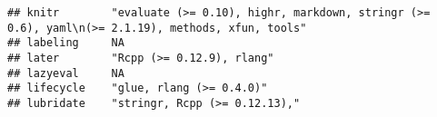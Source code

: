 \documentclass[]{book}
\begin{document}
\begin{verbatim}
## knitr        "evaluate (>= 0.10), highr, markdown, stringr (>= 0.6), yaml\n(>= 2.1.19), methods, xfun, tools"                                                                                                                                                                                                                                                                                                                                                                                                            
## labeling     NA                                                                                                                                                                                                                                                                                                                                                                                                                                                                                                          
## later        "Rcpp (>= 0.12.9), rlang"                                                                                                                                                                                                                                                                                                                                                                                                                                                                                   
## lazyeval     NA                                                                                                                                                                                                                                                                                                                                                                                                                                                                                                          
## lifecycle    "glue, rlang (>= 0.4.0)"                                                                                                                                                                                                                                                                                                                                                                                                                                                                                    
## lubridate    "stringr, Rcpp (>= 0.12.13),"                                                                                                                                                                                                                                                                                                                                                                                                                                                                               

\end{verbatim}
\end{document}
